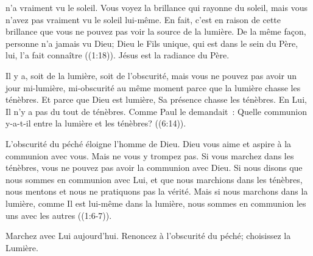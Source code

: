 \dvrule






 n'a vraiment vu le soleil. Vous voyez la brillance
 qui rayonne du soleil, mais vous n'avez pas vraiment vu le soleil lui-même.
 En fait, c'est en raison de cette brillance que vous ne pouvez pas voir
 la source de la lumière. De la même façon,
 \og personne 
 n'a jamais vu Dieu; Dieu le Fils unique, qui est dans le sein du Père, lui,
 l'a fait connaître \fg{} ((1:18)).
 Jésus est la radiance du Père.


Il y a, soit de la lumière, soit de l'obscurité, mais vous ne pouvez pas
 avoir un jour mi-lumière, mi-obscurité au même moment parce que la lumière
 chasse les ténèbres. Et parce que Dieu est lumière, Sa présence chasse
 les ténèbres. En Lui, Il n'y a pas du tout de ténèbres.
 Comme Paul le demandait~: 
 \og Quelle communion y-a-t-il entre la lumière et les ténèbres? \fg{}
 ((6:14)).

L'obscurité du péché éloigne l'homme de Dieu. Dieu vous aime et aspire
 à la communion avec vous. Mais ne vous y trompez pas.
 Si vous marchez dans les ténèbres, vous ne pouvez pas avoir
 la communion avec Dieu.
 \og Si nous disons que nous sommes en communion avec Lui,
 et que nous marchions dans les ténèbres, nous mentons et nous ne pratiquons
 pas la vérité. Mais si nous marchons dans la lumière,
 comme Il est lui-même dans la lumière, nous sommes en communion
 les uns avec les autres \fg{} ((1:6-7)).

Marchez avec Lui aujourd'hui. Renoncez à l'obscurité du péché;
 choisissez la Lumière.


\dvrule


